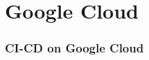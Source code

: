 \setcounter{section}{0}
\part{Google Cloud}\label{sec:googleCloud}

\section{CI-CD on Google Cloud}


\newpage